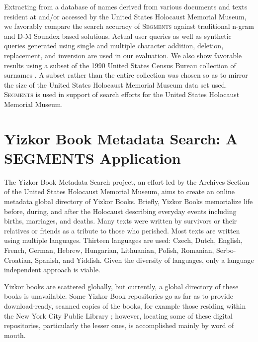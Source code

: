 \documentclass{endm}
\begin{document}
\begin{CJK}{UTF8}{song}
Extracting from a database of names derived from various documents and texts resident at and/or accessed by the United States Holocaust Memorial Museum, we favorably compare the search accuracy of S\textsc{egments} against traditional n-gram and D-M Soundex based solutions. Actual user queries as well as synthetic queries generated using single and multiple character addition, deletion, replacement, and inversion are used in our evaluation.  We also show favorable results using a subset of the 1990 United States Census Bureau collection of surnames \cite{us_census_bureau}.  A subset rather than the entire collection was chosen so as to mirror the size of the United States Holocaust Memorial Museum data set used.  S\textsc{egments} is used in support of search efforts for the United States Holocaust Memorial Museum.  

\section{Yizkor Book Metadata Search: A S\textsc{EGMENTS} Application} %
\label{sec:yizkor_book_metadata_search}

The Yizkor Book Metadata Search project, an effort led by the Archives Section of the United States Holocaust Memorial Museum, aims to create an online metadata global directory of Yizkor Books.  Briefly, Yizkor Books memorialize life before, during, and after the Holocaust describing everyday events including births, marriages, and deaths.  Many texts were written by survivors or their relatives or friends as a tribute to those who perished.  Most texts are written using multiple languages.  Thirteen languages are used: Czech, Dutch, English, French, German, Hebrew, Hungarian, Lithuanian, Polish, Romanian, Serbo-Croatian, Spanish, and Yiddish.  Given the diversity of languages, only a language independent approach is viable. 



Yizkor books are scattered globally, but currently, a global directory of these books is unavailable.  Some Yizkor Book repositories go as far as to provide download-ready, scanned copies of the books, for example those residing within the New York City Public Library \cite{nypl.org}; however, locating some of these digital repositories, particularly the lesser ones, is accomplished mainly by word of mouth.   


\end{CJK}
\end{document}
